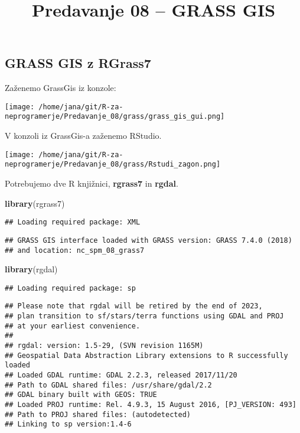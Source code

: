 \documentclass[]{article}
\title{Predavanje 08 -- GRASS GIS}
\author{}
\date{\vspace{-2.5em}}
\newenvironment{Shaded}{\begin{snugshade}}{\end{snugshade}}
\newcommand{\KeywordTok}[1]{\textcolor[rgb]{0.13,0.29,0.53}{\textbf{#1}}}
\newcommand{\NormalTok}[1]{#1}
\begin{document}
\maketitle

\subsection{GRASS GIS z RGrass7}\label{grass-gis-z-rgrass7}


Zaženemo GrassGis iz konzole:

\texttt{[image: /home/jana/git/R-za-neprogramerje/Predavanje\_08/grass/grass\_gis\_gui.png]}

V konzoli iz GrassGis-a zaženemo RStudio.

\texttt{[image: /home/jana/git/R-za-neprogramerje/Predavanje\_08/grass/Rstudi\_zagon.png]}

Potrebujemo dve R knjižnici, \textbf{rgrass7} in \textbf{rgdal}.

\begin{Shaded}
\begin{Highlighting}[]
\KeywordTok{library}\NormalTok{(rgrass7)}
\end{Highlighting}
\end{Shaded}

\begin{verbatim}
## Loading required package: XML
\end{verbatim}

\begin{verbatim}
## GRASS GIS interface loaded with GRASS version: GRASS 7.4.0 (2018)
## and location: nc_spm_08_grass7
\end{verbatim}

\begin{Shaded}
\begin{Highlighting}[]
\KeywordTok{library}\NormalTok{(rgdal)}
\end{Highlighting}
\end{Shaded}

\begin{verbatim}
## Loading required package: sp
\end{verbatim}

\begin{verbatim}
## Please note that rgdal will be retired by the end of 2023,
## plan transition to sf/stars/terra functions using GDAL and PROJ
## at your earliest convenience.
## 
## rgdal: version: 1.5-29, (SVN revision 1165M)
## Geospatial Data Abstraction Library extensions to R successfully loaded
## Loaded GDAL runtime: GDAL 2.2.3, released 2017/11/20
## Path to GDAL shared files: /usr/share/gdal/2.2
## GDAL binary built with GEOS: TRUE 
## Loaded PROJ runtime: Rel. 4.9.3, 15 August 2016, [PJ_VERSION: 493]
## Path to PROJ shared files: (autodetected)
## Linking to sp version:1.4-6
\end{verbatim}
\end{document}
